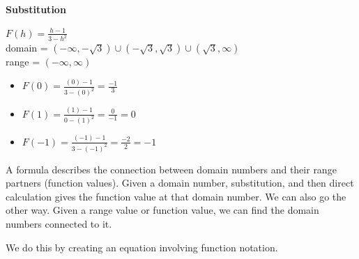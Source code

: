 \documentclass{ximera}
\begin{document}
\begin{procedure}   \textbf{\textcolor{purple!30!blue}{Substitution}}      

$F(h) = \frac{h-1}{3-h^2}$ \\
domain = $(-\infty, -\sqrt{3}) \cup (-\sqrt{3}, \sqrt{3}) \cup (\sqrt{3}, \infty)$ \\
range = $(-\infty, \infty)$


\begin{itemize}
\item $F(0) = \frac{(0) - 1}{3 - (0)^2} = \frac{-1}{3}$
\item $F(1) = \frac{(1) - 1}{0 - (1)^2} = \frac{0}{-1} = 0$
\item $F(-1) = \frac{(-1) - 1}{3 - (-1)^2} = \frac{-2}{2} = -1$
\end{itemize}

\end{procedure}



A formula describes the connection between domain numbers and their range partners (function values).  Given a domain number, substitution, and then direct calculation gives the function value at that domain number.  We can also go the other way.  Given a range value or function value, we can find the domain numbers connected to it.

We do this by creating an equation involving function notation.














\newpage
\end{document}

